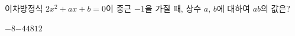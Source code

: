 이차방정식 $2x^2+ax+b=0$이 중근 $-1$을 가질 때, 상수 $a$, $b$에 대하여 $ab$의 값은?
\begin{choices32}{$-8$}{$-4$}{$4$}{$8$}{$12$}\end{choices32}

